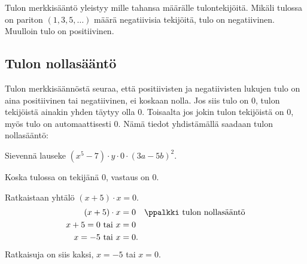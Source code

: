 
Tulon merkkisääntö yleistyy mille tahansa määrälle tulontekijöitä.
Mikäli tulossa on pariton $(1, 3, 5, \ldots)$ määrä negatiivisia tekijöitä, tulo on negatiivinen.
Muulloin tulo on positiivinen.


\newpage

\subsection*{Tulon nollasääntö}

Tulon merkkisäännöstä seuraa, että positiivisten ja negatiivisten lukujen tulo on aina positiivinen tai negatiivinen, ei koskaan nolla.
Jos siis tulo on $0$, tulon tekijöistä ainakin yhden täytyy olla $0$.
Toisaalta jos jokin tulon tekijöistä on $0$, myös tulo on automaattisesti $0$.
Nämä tiedot yhdistämällä saadaan tulon nollasääntö:



\begin{esimerkki}
Sievennä lauseke $(x^5-7)\cdot y \cdot 0\cdot(3a-5b)^2$.
    \begin{esimratk}
	Koska tulossa on tekijänä $0$, vastaus on $0$.
    \end{esimratk}
\end{esimerkki}

\begin{esimerkki} Ratkaistaan yhtälö $(x+5) \cdot x =0 $.
    \begin{align*}
        (x+5)\cdot x &=0 \quad \ppalkki \text{ tulon nollasääntö} \\
        x +5= 0 \text{ tai } x &=0 \\
        x= -5 \text{ tai } x &=0.
    \end{align*}
    Ratkaisuja on siis kaksi, $x= -5$ tai $x= 0$.
\end{esimerkki}


